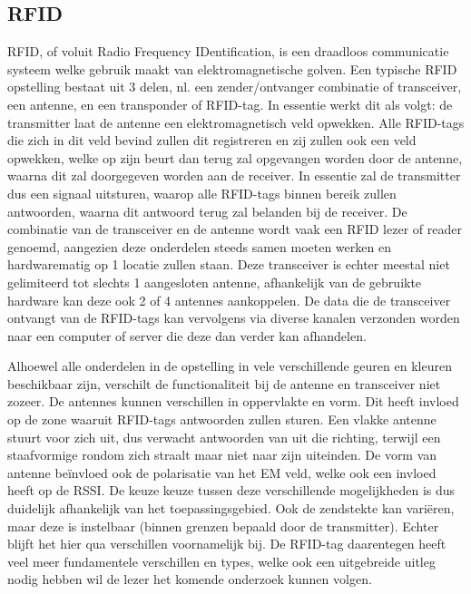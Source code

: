 \subsection{RFID}
\label{subsec:lit-rfid}
RFID, of voluit Radio Frequency IDentification, is een draadloos communicatie systeem welke gebruik maakt van elektromagnetische golven. Een typische RFID opstelling bestaat uit 3 delen, nl. een zender/ontvanger combinatie of transceiver, een antenne, en een transponder of RFID-tag.\autocite{Auxcis2022} In essentie werkt dit als volgt: de transmitter laat de antenne een elektromagnetisch veld opwekken. Alle RFID-tags die zich in dit veld bevind zullen dit registreren en zij zullen ook een veld opwekken, welke op zijn beurt dan terug zal opgevangen worden door de antenne, waarna dit zal doorgegeven worden aan de receiver.
In essentie zal de transmitter dus een signaal uitsturen, waarop alle RFID-tags binnen bereik zullen antwoorden, waarna dit antwoord terug zal belanden bij de receiver. De combinatie van de transceiver en de antenne wordt vaak een RFID lezer of reader genoemd, aangezien deze onderdelen steeds samen moeten werken en hardwarematig op 1 locatie zullen staan.\autocite{Amster2021}
Deze transceiver is echter meestal niet gelimiteerd tot slechts 1 aangesloten antenne, afhankelijk van de gebruikte hardware kan deze ook 2 of 4 antennes aankoppelen. De data die de transceiver ontvangt van de RFID-tags kan vervolgens via diverse kanalen verzonden worden naar een computer of server die deze dan verder kan afhandelen.

Alhoewel alle onderdelen in de opstelling in vele verschillende geuren en kleuren beschikbaar zijn, verschilt de functionaliteit bij de antenne en transceiver niet zozeer. De antennes kunnen verschillen in oppervlakte en vorm. Dit heeft invloed op de zone waaruit RFID-tags antwoorden zullen sturen. Een vlakke antenne stuurt voor zich uit, dus verwacht antwoorden van uit die richting, terwijl een staafvormige rondom zich straalt maar niet naar zijn uiteinden. De vorm van antenne beïnvloed ook de polarisatie van het EM veld, welke ook een invloed heeft op de RSSI. De keuze keuze tussen deze verschillende mogelijkheden is dus duidelijk afhankelijk van het toepassingsgebied. Ook de zendstekte kan variëren, maar deze is instelbaar (binnen grenzen bepaald door de transmitter). Echter blijft het hier qua verschillen voornamelijk bij. De RFID-tag daarentegen heeft veel meer fundamentele verschillen en types, welke ook een uitgebreide uitleg nodig hebben wil de lezer het komende onderzoek kunnen volgen.

